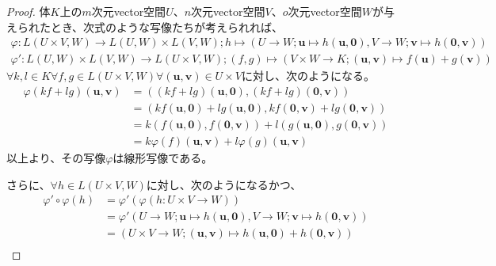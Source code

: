 \documentclass[dvipdfmx]{jsarticle}
\begin{document}
\begin{proof}
体$K$上の$m$次元vector空間$U$、$n$次元vector空間$V$、$o$次元vector空間$W$が与えられたとき、次式のような写像たちが考えられれば、
\begin{align*}
\varphi:L(U \times V,W) \rightarrow L(U,W) \times L(V,W);h \mapsto \left( U \rightarrow W;\mathbf{u} \mapsto h\left( \mathbf{u},\mathbf{0} \right),V \rightarrow W;\mathbf{v} \mapsto h\left( \mathbf{0},\mathbf{v} \right) \right)
\end{align*}
\begin{align*}
\varphi':L(U,W) \times L(V,W) \rightarrow L(U \times V,W);(f,g) \mapsto \left( V \times W \rightarrow K;\left( \mathbf{u},\mathbf{v} \right) \mapsto f\left( \mathbf{u} \right) + g\left( \mathbf{v} \right) \right)
\end{align*}
$\forall k,l \in K\forall f,g \in L(U \times V,W)\forall\left( \mathbf{u},\mathbf{v} \right) \in U \times V$に対し、次のようになる。
\begin{align*}
\varphi(kf + lg)\left( \mathbf{u},\mathbf{v} \right) &= \left( (kf + lg)\left( \mathbf{u},\mathbf{0} \right),(kf + lg)\left( \mathbf{0},\mathbf{v} \right) \right)\\
&= \left( kf\left( \mathbf{u},\mathbf{0} \right) + lg\left( \mathbf{u},\mathbf{0} \right),kf\left( \mathbf{0},\mathbf{v} \right) + lg\left( \mathbf{0},\mathbf{v} \right) \right)\\
&= k\left( f\left( \mathbf{u},\mathbf{0} \right),f\left( \mathbf{0},\mathbf{v} \right) \right) + l\left( g\left( \mathbf{u},\mathbf{0} \right),g\left( \mathbf{0},\mathbf{v} \right) \right)\\
&= k\varphi(f)\left( \mathbf{u},\mathbf{v} \right) + l\varphi(g)\left( \mathbf{u},\mathbf{v} \right)
\end{align*}
以上より、その写像$\varphi$は線形写像である。\par
さらに、$\forall h \in L(U \times V,W)$に対し、次のようになるかつ、
\begin{align*}
\varphi' \circ \varphi(h) &= \varphi'\left( \varphi(h:U \times V \rightarrow W) \right)\\
&= \varphi'\left( U \rightarrow W;\mathbf{u} \mapsto h\left( \mathbf{u},\mathbf{0} \right),V \rightarrow W;\mathbf{v} \mapsto h\left( \mathbf{0},\mathbf{v} \right) \right)\\
&= \left( U \times V \rightarrow W;\left( \mathbf{u},\mathbf{v} \right) \mapsto h\left( \mathbf{u},\mathbf{0} \right) + h\left( \mathbf{0},\mathbf{v} \right) \right)\\

\end{align*}
\end{proof}
\end{document}
